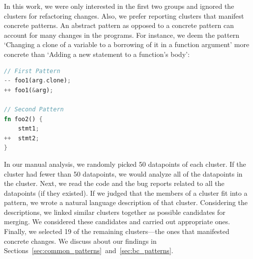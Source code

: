 In this work, we were only interested in the first two groups and ignored the clusters for refactoring changes. Also, we prefer reporting clusters that manifest concrete patterns. An abstract pattern as opposed to a concrete pattern can account for many changes in the programs. For instance, we deem the pattern `Changing a clone of a variable to a borrowing of it in a function argument' more concrete than `Adding a new statement to a function's body':

\begin{lstlisting}[language=Rust, style=colouredRust]
// First Pattern
-- foo1(arg.clone);
++ foo1(&arg);

// Second Pattern
fn foo2() {
    stmt1;
++  stmt2;
}

\end{lstlisting}


In our manual analysis, we randomly picked 50 datapoints of each cluster. If the cluster had fewer than 50 datapoints, we would analyze all of the datapoints in the cluster. Next, we read the code and the bug reports related to all the datapoints (if they existed). If we judged that the members of a cluster fit into a pattern, we wrote a natural language description of that cluster. Considering the descriptions, we linked similar clusters together as possible candidates for merging. We considered these candidates and carried out appropriate ones. Finally, we selected 19 of the remaining clusters---the ones that manifested concrete changes. We discuss about our findings in Sections~\ref{sec:common_patterns}~and~\ref{sec:bc_patterns}.
